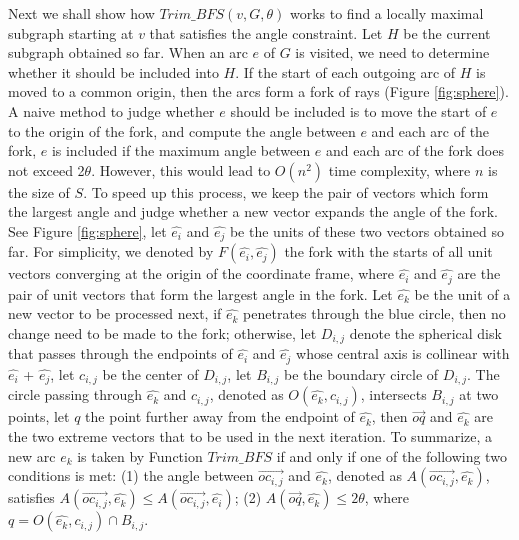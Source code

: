 Next we shall show how $Trim\_BFS(v, G, \theta)$ works to find a locally maximal subgraph starting at $v$ that satisfies the angle constraint. Let $H$ be the current subgraph obtained so far. When an arc $e$ of $G$ is visited, we need to determine whether it should be included into $H$. If the start of each outgoing arc of $H$ is moved to a common origin, then the arcs form a fork of rays (Figure \ref{fig:sphere}). A naive method to judge whether $e$ should be included is to move the start of $e$ to the origin of the fork, and compute the angle between $e$ and each arc of the fork, $e$ is included if the maximum angle between $e$ and each arc of the fork does not exceed 2$\theta$. However, this would lead to $O(n^{2})$ time complexity, where $n$ is the size of $S$. To speed up this process, we keep the pair of vectors which form the largest angle and judge whether a new vector expands the angle of the fork. See Figure \ref{fig:sphere}, let $\hat{e_i}$  and $\hat{e_j}$ be the units of these two vectors obtained so far. For simplicity, we denoted by $F( \hat{e_i}, \hat{e_j} )$ the fork with the starts of all unit vectors converging at the origin of the coordinate frame, where $\hat{e_i}$  and  $\hat{e_j}$  are the pair of unit vectors that form the largest angle in the fork. Let $\hat{e_k}$  be the unit of a new vector to be processed next, if $\hat{e_k}$ penetrates through the blue circle, then no change need to be made to the fork; otherwise, let $D_{i,j}$ denote the spherical disk that passes through the endpoints of $\hat{e_i}$  and $\hat{e_j}$ whose central axis is collinear with $\hat{e_i}$  + $\hat{e_j}$, let $c_{i,j}$ be the center of $D_{i,j}$, let $B_{i,j}$ be the boundary circle of $D_{i,j}$. The circle passing through $\hat{e_k}$  and $c_{i,j}$, denoted as $O( \hat{e_k}, c_{i,j})$, intersects  $B_{i,j}$ at two points, let $q$ the point further away from the endpoint of $\hat{e_k}$, then $\overrightarrow{oq}$ and $\hat{e_k}$ are the two extreme vectors that to be used in the next iteration. To summarize, a new arc $e_k$ is taken by Function $Trim\_BFS$ if and only if one of the following two conditions is met:
(1) the angle between $\overrightarrow{oc_{i,j}}$ and $\hat{e_k}$, denoted as $A(\overrightarrow{oc_{i,j}}, \hat{e_k})$, satisfies  $A(\overrightarrow{oc_{i,j}}, \hat{e_k}) \leq A(\overrightarrow{oc_{i,j}}, \hat{e_i})$;
(2) $A(\overrightarrow{oq}, \hat{e_k})  \leq  2\theta$, where $q = O( \hat{e_k}, c_{i,j}) \cap B_{i,j}$.


